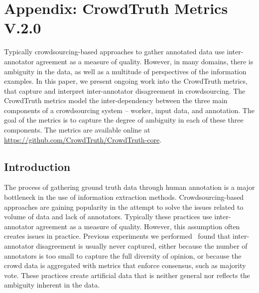 
\manualmark
{}

\renewcommand{\thesection}{\Alph{section}}

\appendix

\chapter*{Appendix: CrowdTruth Metrics V.2.0}

Typically crowdsourcing-based approaches to gather annotated data use inter-annotator agreement as a measure of quality. However, in many domains, there is ambiguity in the data, as well as a multitude of perspectives of the information examples. In this paper, we present ongoing work into the CrowdTruth metrics, that capture and interpret inter-annotator disagreement in crowdsourcing. The CrowdTruth metrics model the inter-dependency between the three main components of a crowdsourcing system -- worker, input data, and annotation. The goal of the metrics is to capture the degree of ambiguity in each of these three components. The metrics are available online at \url{https://github.com/CrowdTruth/CrowdTruth-core}.

\section{Introduction}

The process of gathering ground truth data through human annotation is a major bottleneck in the use of information extraction methods. Crowdsourcing-based approaches are gaining popularity in the attempt to solve the issues related to volume of data and lack of annotators. Typically these practices use inter-annotator agreement as a measure of quality. However, this assumption often creates issues in practice. Previous experiments we performed~\cite{aroyo2013crowd} found that inter-annotator disagreement is usually never captured, either because the number of annotators is too small to capture the full diversity of opinion, or because the crowd data is aggregated with metrics that enforce consensus, such as majority vote.  These practices create artificial data that is neither general nor reflects the ambiguity inherent in the data.

